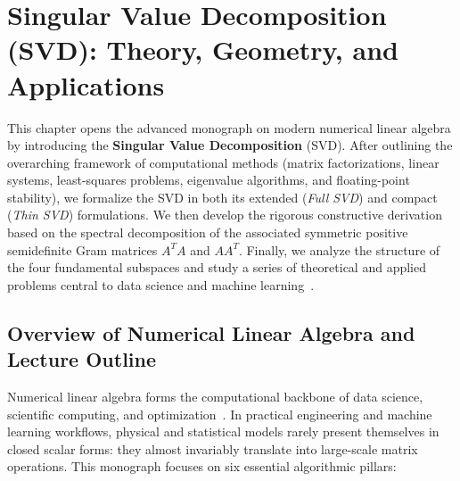 \chapter[Singular Value Decomposition (SVD)]{Singular Value Decomposition (SVD): Theory, Geometry, and Applications}
\label{chap:singular-value-decomposition-svd}

This chapter opens the advanced monograph on modern numerical linear algebra by introducing the \textbf{Singular Value Decomposition} (SVD). After outlining the overarching framework of computational methods (matrix factorizations, linear systems, least-squares problems, eigenvalue algorithms, and floating-point stability), we formalize the SVD in both its extended (\textit{Full SVD}) and compact (\textit{Thin SVD}) formulations. We then develop the rigorous constructive derivation based on the spectral decomposition of the associated symmetric positive semidefinite Gram matrices $A^T A$ and $A A^T$. Finally, we analyze the structure of the four fundamental subspaces and study a series of theoretical and applied problems central to data science and machine learning~\cite{golub2013matrix,trefethen1997numerical,strang2019linear}.

\FloatBarrier
\section{Overview of Numerical Linear Algebra and Lecture Outline}
\label{sec:svd-overview-outline-en}

Numerical linear algebra forms the computational backbone of data science, scientific computing, and optimization~\cite{demmel1997applied,trefethen1997numerical}. In practical engineering and machine learning workflows, physical and statistical models rarely present themselves in closed scalar forms: they almost invariably translate into large-scale matrix operations. This monograph focuses on six essential algorithmic pillars:

